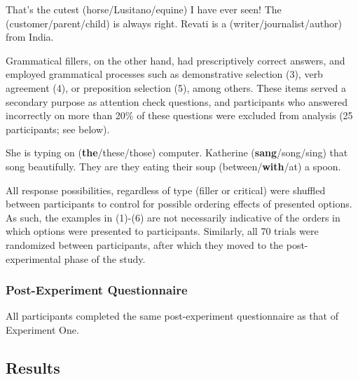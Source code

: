 \documentclass[10pt,letterpaper]{article}
\begin{document}
	\begin{exe}
		\ex That's the cutest (horse/Lusitano/equine) I have ever seen!
		\ex The (customer/parent/child) is always right.
		\ex Revati is a (writer/journalist/author) from India.
	\end{exe}
	
	Grammatical fillers, on the other hand, had prescriptively correct answers, and employed grammatical processes such as demonstrative selection (3), verb agreement (4), or preposition selection (5), among others. These items served a secondary purpose as attention check questions, and participants who answered incorrectly on more than 20\% of these questions were excluded from analysis (25 participants; see below).
	
	\begin{exe}
		\ex She is typing on (\textbf{the}/these/those) computer.
		\ex Katherine (\textbf{sang}/song/sing) that song beautifully. 
		\ex They are they eating their soup (between/\textbf{with}/at) a spoon.
	\end{exe}
	
	All response possibilities, regardless of type (filler or critical) were shuffled between participants to control for possible ordering effects of presented options. As such, the examples in (1)-(6) are not necessarily indicative of the orders in which options were presented to participants. Similarly, all 70 trials were randomized between participants, after which they moved to the post-experimental phase of the study. 
	
	\subsubsection{Post-Experiment Questionnaire}
	All participants completed the same post-experiment questionnaire as that of Experiment One. 
	
	\subsection{Results}
	
\end{document}
